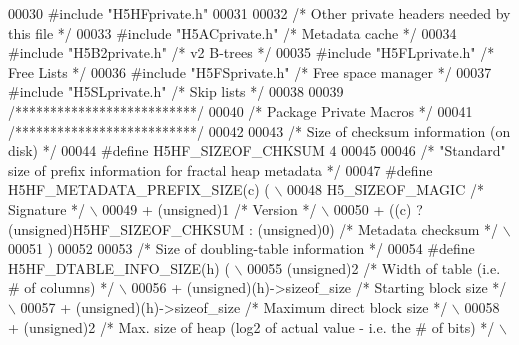 \begin{DoxyCode}
00030 \textcolor{preprocessor}{#include "H5HFprivate.h"}
00031 
00032 \textcolor{comment}{/* Other private headers needed by this file */}
00033 \textcolor{preprocessor}{#include "H5ACprivate.h"}    \textcolor{comment}{/* Metadata cache           */}
00034 \textcolor{preprocessor}{#include "H5B2private.h"}    \textcolor{comment}{/* v2 B-trees               */}
00035 \textcolor{preprocessor}{#include "H5FLprivate.h"}    \textcolor{comment}{/* Free Lists                           */}
00036 \textcolor{preprocessor}{#include "H5FSprivate.h"}    \textcolor{comment}{/* Free space manager           */}
00037 \textcolor{preprocessor}{#include "H5SLprivate.h"}    \textcolor{comment}{/* Skip lists               */}
00038 
00039 \textcolor{comment}{/**************************/}
00040 \textcolor{comment}{/* Package Private Macros */}
00041 \textcolor{comment}{/**************************/}
00042 
00043 \textcolor{comment}{/* Size of checksum information (on disk) */}
00044 \textcolor{preprocessor}{#define H5HF\_SIZEOF\_CHKSUM      4}
00045 
00046 \textcolor{comment}{/* "Standard" size of prefix information for fractal heap metadata */}
00047 \textcolor{preprocessor}{#define H5HF\_METADATA\_PREFIX\_SIZE(c) (                                        \(\backslash\)}
00048 \textcolor{preprocessor}{    H5\_SIZEOF\_MAGIC   }\textcolor{comment}{/* Signature */}\textcolor{preprocessor}{                                         \(\backslash\)}
00049 \textcolor{preprocessor}{    + (unsigned)1 }\textcolor{comment}{/* Version */}\textcolor{preprocessor}{                                               \(\backslash\)}
00050 \textcolor{preprocessor}{    + ((c) ? (unsigned)H5HF\_SIZEOF\_CHKSUM : (unsigned)0) }\textcolor{comment}{/* Metadata checksum */}\textcolor{preprocessor}{ \(\backslash\)}
00051 \textcolor{preprocessor}{    )}
00052 
00053 \textcolor{comment}{/* Size of doubling-table information */}
00054 \textcolor{preprocessor}{#define H5HF\_DTABLE\_INFO\_SIZE(h) (                                            \(\backslash\)}
00055 \textcolor{preprocessor}{    (unsigned)2   }\textcolor{comment}{/* Width of table (i.e. # of columns) */}\textcolor{preprocessor}{                    \(\backslash\)}
00056 \textcolor{preprocessor}{    + (unsigned)(h)->sizeof\_size }\textcolor{comment}{/* Starting block size */}\textcolor{preprocessor}{                    \(\backslash\)}
00057 \textcolor{preprocessor}{    + (unsigned)(h)->sizeof\_size }\textcolor{comment}{/* Maximum direct block size */}\textcolor{preprocessor}{              \(\backslash\)}
00058 \textcolor{preprocessor}{    + (unsigned)2 }\textcolor{comment}{/* Max. size of heap (log2 of actual value - i.e. the # of bits) */}\textcolor{preprocessor}{   \(\backslash\)}

\end{DoxyCode}
